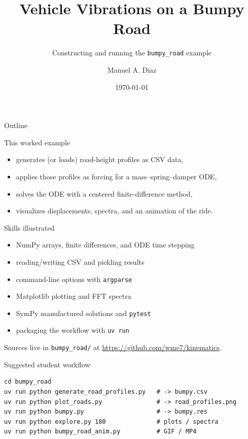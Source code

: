\documentclass[aspectratio=169,11pt]{beamer}
\title{Vehicle Vibrations on a Bumpy Road}
\subtitle{Constructing and running the \texttt{bumpy\_road} example}
\author{Manuel A. Diaz}
\institute{InspiraSTEM Internship}
\date{\today}
\begin{document}

\begin{frame}
  \titlepage
\end{frame}

\begin{frame}{Outline}
  \tableofcontents
\end{frame}

\begin{frame}{This worked example}
  \begin{itemize}
    \item generates (or loads) road-height profiles as CSV data,
    \item applies those profiles as forcing for a mass--spring--damper ODE,
    \item solves the ODE with a centered finite-difference method,
    \item visualizes displacements, spectra, and an animation of the ride.
  \end{itemize}
\end{frame}

\begin{frame}{Skills illustrated}
  \begin{itemize}
    \item NumPy arrays, finite differences, and ODE time stepping
    \item reading/writing CSV and pickling results
    \item command-line options with \texttt{argparse}
    \item Matplotlib plotting and FFT spectra
    \item SymPy manufactured solutions and \texttt{pytest}
    \item packaging the workflow with \texttt{uv run}
  \end{itemize}
  \vspace{0.8em}
  Sources live in \texttt{bumpy\_road/} at
  \url{https://github.com/wme7/kinematics}.
\end{frame}

\begin{frame}[fragile]{Suggested student workflow}
\begin{lstlisting}[style=terminal]
cd bumpy_road
uv run python generate_road_profiles.py   # -> bumpy.csv
uv run python plot_roads.py               # -> road_profiles.png
uv run python bumpy.py                    # -> bumpy.res
uv run python explore.py 180              # plots / spectra
uv run python bumpy_road_anim.py          # GIF / MP4
\end{lstlisting}
\end{frame}








\end{document}
